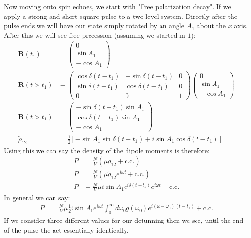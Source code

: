 Now moving onto spin echoes, we start with "Free polarization decay". If we apply a strong and short square pulse to a two level system.
Directly after the pulse ends we will have our state simply rotated by an angle $A_1$ about the $x$ axis. After this we will see free precession (assuming we started in $1$):
\begin{align*}
	\bm{R}(t_1) &= \begin{pmatrix}
		0 \\
		\sin A_1 \\
		-\cos A_1
		       \end{pmatrix} \\
	\bm{R}(t > t_1) &= \begin{pmatrix}
		\cos\delta(t-t_1) & -\sin\delta(t-t_1) & 0 \\
		\sin\delta(t-t_1) & \cos\delta(t-t_1) & 0 \\
		0 & 0 & 1
			   \end{pmatrix}
	\begin{pmatrix}
		0 \\
		\sin A_1 \\
		-\cos A_1
		       \end{pmatrix} \\
	\bm{R}(t>t_1) &= \begin{pmatrix}
		-\sin\delta(t-t_1)\sin A_1 \\
		\cos\delta(t-t_1)\sin A_1 \\
		-\cos A_1
			 \end{pmatrix} \\
	\tilde{\rho}_{12} &= \frac{1}{2}\left[-\sin A_1 \sin \delta(t - t_1) + i\sin A_1 \cos\delta(t-t_1)\right]
\end{align*}
Using this we can say the density of the dipole moments is therefore:
\begin{align*}
	P &= \frac{N}{V}(\mu \rho_{12} + \text{c.c.}) \\
	P &= \frac{N}{V}(\mu \tilde{\rho}_{12}e^{i\omega t} + \text{c.c.}) \\
	P &= \frac{N}{V}\mu i\sin A_1 e^{i\delta(t - t_1)} e^{i\omega t} + \text{c.c.}
\end{align*}
In general we can say:
\begin{align*}
	P &= \frac{N}{V} \mu \frac{1}{2} i\sin A_1 e^{i\omega t}\int_0^\infty d\omega_0 g(\omega_0) e^{i(\omega-\omega_0)(t-t_1)} + \text{c.c.}
\end{align*}
If we consider three different values for our detunning then we see, until the end of the pulse the act essentially identically.
